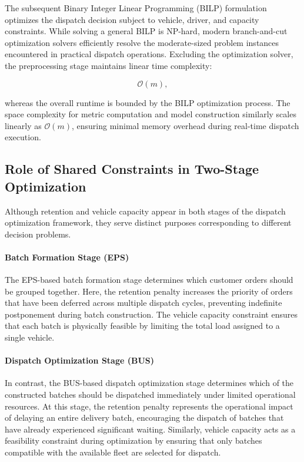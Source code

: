 \documentclass{article}
\begin{document}
The subsequent Binary Integer Linear Programming (BILP) formulation optimizes the dispatch decision subject to vehicle, driver, and capacity constraints. While solving a general BILP is NP-hard, modern branch-and-cut optimization solvers efficiently resolve the moderate-sized problem instances encountered in practical dispatch operations. Excluding the optimization solver, the preprocessing stage maintains linear time complexity:

\begin{equation}
\mathcal{O}(m),
\end{equation}

whereas the overall runtime is bounded by the BILP optimization process. The space complexity for metric computation and model construction similarly scales linearly as $\mathcal{O}(m)$, ensuring minimal memory overhead during real-time dispatch execution.

\subsection{Role of Shared Constraints in Two-Stage Optimization}
\label{subsec:role_of_shared_constraints}

Although retention and vehicle capacity appear in both stages of the dispatch optimization framework, they serve distinct purposes corresponding to different decision problems.

\paragraph{Batch Formation Stage (EPS)}
The EPS-based batch formation stage determines which customer orders should be grouped together. Here, the retention penalty increases the priority of orders that have been deferred across multiple dispatch cycles, preventing indefinite postponement during batch construction. The vehicle capacity constraint ensures that each batch is physically feasible by limiting the total load assigned to a single vehicle.

\paragraph{Dispatch Optimization Stage (BUS)}
In contrast, the BUS-based dispatch optimization stage determines which of the constructed batches should be dispatched immediately under limited operational resources. At this stage, the retention penalty represents the operational impact of delaying an entire delivery batch, encouraging the dispatch of batches that have already experienced significant waiting. Similarly, vehicle capacity acts as a feasibility constraint during optimization by ensuring that only batches compatible with the available fleet are selected for dispatch.
\end{document}
